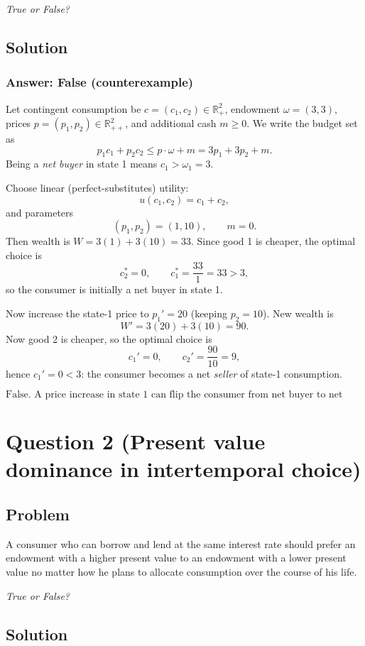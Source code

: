 \documentclass[12pt]{article}
\begin{document}
\emph{True or False?}

\subsection*{Solution}
\subsubsection*{Answer: False (counterexample)}
Let contingent consumption be \(c=(c_1,c_2)\in\mathbb{R}^2_+\), endowment \(\omega=(3,3)\), prices \(p=(p_1,p_2)\in\mathbb{R}^2_{++}\), and additional cash \(m\ge 0\).
We write the budget set as
\[
p_1 c_1 + p_2 c_2 \le p\cdot \omega + m = 3p_1 + 3p_2 + m.
\]
Being a \emph{net buyer} in state 1 means \(c_1>\omega_1=3\).

Choose linear (perfect-substitutes) utility:
\[
u(c_1,c_2)=c_1+c_2,
\]
and parameters
\[
(p_1,p_2)=(1,10),\qquad m=0.
\]
Then wealth is \(W=3(1)+3(10)=33\). Since good 1 is cheaper, the optimal choice is
\[
c_2^*=0,\qquad c_1^*=\frac{33}{1}=33>3,
\]
so the consumer is initially a net buyer in state 1.

Now increase the state-1 price to \(p_1'=20\) (keeping \(p_2=10\)). New wealth is
\[
W' = 3(20)+3(10)=90.
\]
Now good 2 is cheaper, so the optimal choice is
\[
c_1'=0,\qquad c_2'=\frac{90}{10}=9,
\]
hence \(c_1'=0<3\): the consumer becomes a net \emph{seller} of state-1 consumption.

\[
\boxed{\text{False. A price increase in state 1 can flip the consumer from net buyer to net seller.}}
\]

\newpage
\section*{Question 2 (Present value dominance in intertemporal choice)}
\subsection*{Problem}
A consumer who can borrow and lend at the same interest rate should prefer an endowment with a higher present value
to an endowment with a lower present value no matter how he plans to allocate consumption over the course of his life.

\emph{True or False?}

\subsection*{Solution}
\end{document}
